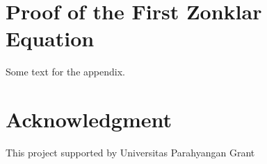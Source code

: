 \documentclass[journal]{IEEEtran}
\begin{document}





					      \appendices
					      \section{Proof of the First Zonklar Equation}
					      Some text for the appendix.

					      \section*{Acknowledgment}


					      This project supported by Universitas Parahyangan Grant
\end{document}
